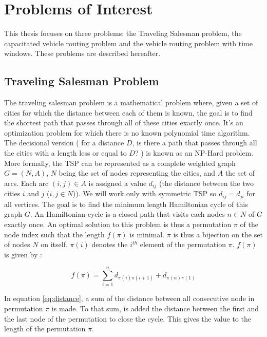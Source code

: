 
\section{Problems of Interest}\label{poi}
This thesis focuses on three problems: the Traveling Salesman problem, the capacitated vehicle routing problem and the vehicle routing problem with time windows. These problems are described hereafter. 

\subsection{Traveling Salesman Problem}
The traveling salesman problem is a mathematical problem where, given a set of cities for which the distance between each of them is known, the goal is to find the shortest path that passes through all of these cities exactly once. It's an optimization problem for which there is no known polynomial time algorithm. The decisional version ( for a distance $D$, is there a path that passes through all the cities with a length less or equal to $D$? ) is known as an NP-Hard problem.
More formally, the TSP can be represented as a complete weighted graph $ G = (N,A) $, $N$ being the set of nodes representing the cities, and $A$ the set of arcs. Each arc $(i,j) \in A$ is assigned a value $d_{ij}$ (the distance between the two cities $i$ and $j$ ($i,j \in N$)). We will work only with symmetric TSP so $d_{ij} = d_{ji}$ for all vertices. The goal is to find the minimum length Hamiltonian cycle of this graph $G$. An Hamiltonian cycle is a closed path that visits each nodes $n \in N$ of $G$ exactly once. An optimal solution to this problem is thus a permutation $\pi$ of the node index such that the length $f(\pi)$ is minimal. $\pi$ is thus a bijection on the set of nodes $N$ on itself. $\pi (i)$ denotes the $i^{th}$ element of the permutation $\pi$. $f(\pi)$ is given by \cite{dorigo2004ant} : 

\begin{equation}
f(\pi) = \sum_{i=1}^{n} d_{\pi(i)\pi(i+1)} + d_{\pi(n)\pi(1)}
\label{eq:distance}
\end{equation}

In equation \ref{eq:distance}, a sum of the distance between all consecutive node in permutation $\pi$ is made. To that sum, is added the distance between the first and the last node of the permutation to close the cycle. This gives the value to the length of the permutation $\pi$.


